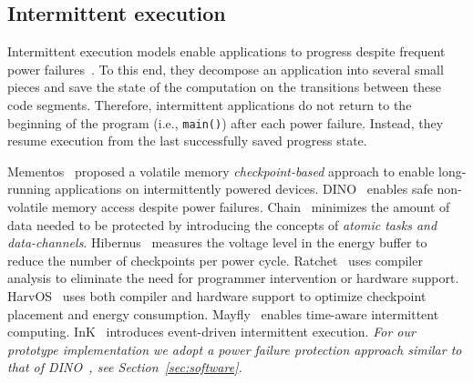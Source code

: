 \subsection{Intermittent execution}
Intermittent execution models enable applications to progress despite frequent
power failures~\cite{van2016intermittent,colin2016chain,lucia2015simpler,bhatti2017harvos,gobieski2019intelligence}. To this end, they decompose an application into several small pieces and save the state of the computation on the transitions between these code segments. Therefore, intermittent applications do not return to the beginning of the program (i.e., \texttt{main()}) after each power failure.
Instead, they resume execution from the last successfully saved progress state.   


Mementos~\cite{ransford2011mementos} proposed a volatile memory \emph{checkpoint-based} approach to enable long-running applications on intermittently powered devices. DINO~\cite{dino} enables safe non-volatile memory access despite power failures. Chain~\cite{colin2016chain} minimizes the amount of data needed to be protected by introducing the concepts of \emph{atomic tasks and data-channels}. Hibernus~\cite{balsamo2014hibernus,balsamo2016hibernus++} measures the voltage level in the energy buffer to reduce the number of checkpoints per power cycle. Ratchet~\cite{van2016intermittent} uses compiler analysis to eliminate the need for programmer intervention or hardware support. HarvOS~\cite{bhatti2017harvos} uses both compiler and hardware support to optimize checkpoint placement and energy consumption. Mayfly~\cite{hester2017timely} enables time-aware intermittent computing. InK~\cite{yildirim2018ink} introduces event-driven intermittent execution.  
\emph{For our prototype implementation we adopt a power failure protection approach similar to that of DINO~\cite{dino}, see Section~\ref{sec:software}.}

